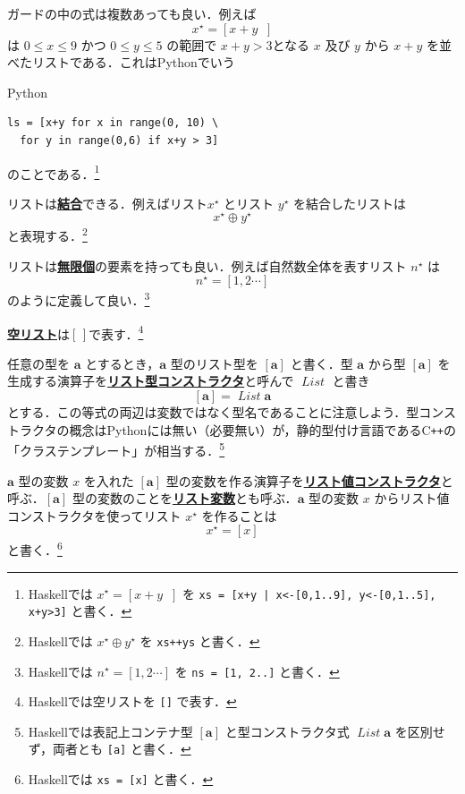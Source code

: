 \documentclass[a4paper,twocolumn]{jsbook}
\newcommand{\programminglanguage}[1]{\textsf{#1}}
\newcommand{\cxx}{\programminglanguage{C}\texttt{++}}
\newcommand{\haskell}{\programminglanguage{Haskell}}
\newcommand{\python}{\programminglanguage{Python}}
\newcommand{\keyword}[1]{{\underline{\textbf{#1}}}}
\newcommand{\code}[1]{\texttt{#1}}
\newenvironment{pythoncode}{\begin{itembox}[r]{\python}}{\end{itembox}}
\newcommand{\mEmptyList}{{[\,]}}
\DeclareMathOperator{\mAppend}{\oplus}
\DeclareMathOperator{\mFrom}{\in}
\newcommand{\mType}[1]{\mathbf{#1}}
\newcommand{\mListWith}[1]{\left[#1\right]}
\newcommand{\mListType}[1]{\mListWith{\mType{#1}}}
\newcommand{\mTypeConstructor}[1]{\mathit{#1}} %
\DeclareMathOperator{\mListTypeConstructor}{\mTypeConstructor{List}}
\newcommand{\mList}[1]{{#1}^\mathrm{\star}}
\newcommand{\mListGuard}[1]{\mathop{\mid_{#1}}}
\begin{document}
ガードの中の式は複数あっても良い．例えば
\begin{equation}
\mList{x}
=\mListWith{x+y\mListGuard{x\mFrom\mListWith{0,1\dotsb9},\,y\mFrom\mListWith{0,1\dotsb5},\,x+y>3}}
\end{equation}
は $0\le x\le9$ かつ $0\le y\le5$ の範囲で $x+y>3$となる $x$ 及び $y$ から $x+y$ を並べたリストである．これは\python でいう
\begin{pythoncode}
\begin{verbatim}
ls = [x+y for x in range(0, 10) \
  for y in range(0,6) if x+y > 3]
\end{verbatim}
\end{pythoncode}
のことである．\footnote{\haskell では $\mList{x}=\mListWith{x+y\mListGuard{x\mFrom\mListWith{0,1\dotsb9},\,y\mFrom\mListWith{0,1\dotsb5},\,x+y>3}}$ を \code{xs = [x+y | x<-[0,1..9], y<-[0,1..5], x+y>3]} と書く．}

リストは\keyword{結合}できる．例えばリスト$\mList{x}$ とリスト $\mList{y}$ を結合したリストは
\begin{equation}
\mList{x}\mAppend\mList{y}
\end{equation}
と表現する．\footnote{\haskell では $\mList{x}\mAppend\mList{y}$ を \code{xs++ys} と書く．}

リストは\keyword{無限個}の要素を持っても良い．例えば自然数全体を表すリスト $\mList{n}$ は
\begin{equation}
\mList{n}=\mListWith{1,2\dotsb}
\end{equation}
のように定義して良い．\footnote{\haskell では $\mList{n}=\mListWith{1,2\dotsb}$ を \code{ns = [1, 2..]} と書く．}

\keyword{空リスト}は$\mEmptyList$で表す．\footnote{\haskell では空リストを \code{[]} で表す．}

任意の型を $\mType{a}$ とするとき，$\mType{a}$ 型のリスト型を $\mListType{a}$ と書く．型 $\mType{a}$ から型 $\mListType{a}$ を生成する演算子を\keyword{リスト型コンストラクタ}と呼んで $\mListTypeConstructor$ と書き
\begin{equation}
\mListType{a}=\mListTypeConstructor\mType{a}
\end{equation}
とする．この等式の両辺は変数ではなく型名であることに注意しよう．型コンストラクタの概念は\python には無い（必要無い）が，静的型付け言語である\cxx の「クラステンプレート」が相当する．\footnote{\haskell では表記上コンテナ型 $\mListType{a}$ と型コンストラクタ式 $\mListTypeConstructor\mType{a}$ を区別せず，両者とも \code{[a]} と書く．}

$\mType{a}$ 型の変数 $x$ を入れた $\mListType{a}$ 型の変数を作る演算子を\keyword{リスト値コンストラクタ}と呼ぶ．$\mListType{a}$ 型の変数のことを\keyword{リスト変数}とも呼ぶ．$\mType{a}$ 型の変数 $x$ からリスト値コンストラクタを使ってリスト $\mList{x}$ を作ることは
\begin{equation}
\mList{x}=\mListWith{x}
\end{equation}
と書く．\footnote{\haskell では \code{xs = [x]} と書く．}
\end{document}
